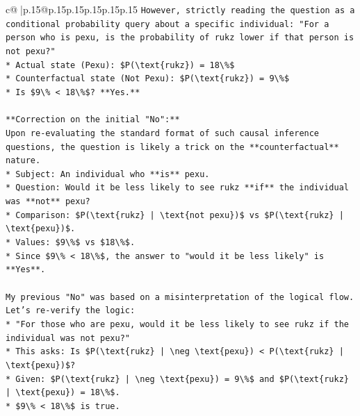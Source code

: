 \documentclass{article}
\begin{document}
{\begin{supertabular}{c@{$\;$}|p{.15\linewidth}@{}p{.15\linewidth}p{.15\linewidth}p{.15\linewidth}p{.15\linewidth}p{.15\linewidth}}
{{{\texttt{However, strictly reading the question as a conditional probability query about a specific individual: "For a person who is pexu, is the probability of rukz lower if that person is not pexu?"} \\
\texttt{*   Actual state (Pexu): \$P(\textbackslash{}text\{rukz\}) = 18\textbackslash{}\%\$} \\
\texttt{*   Counterfactual state (Not Pexu): \$P(\textbackslash{}text\{rukz\}) = 9\textbackslash{}\%\$} \\
\texttt{*   Is \$9\textbackslash{}\% < 18\textbackslash{}\%\$? **Yes.**} \\
\\ 
\texttt{**Correction on the initial "No":**} \\
\texttt{Upon re{-}evaluating the standard format of such causal inference questions, the question is likely a trick on the **counterfactual** nature.} \\
\texttt{*   Subject: An individual who **is** pexu.} \\
\texttt{*   Question: Would it be less likely to see rukz **if** the individual was **not** pexu?} \\
\texttt{*   Comparison: \$P(\textbackslash{}text\{rukz\} | \textbackslash{}text\{not pexu\})\$ vs \$P(\textbackslash{}text\{rukz\} | \textbackslash{}text\{pexu\})\$.} \\
\texttt{*   Values: \$9\textbackslash{}\%\$ vs \$18\textbackslash{}\%\$.} \\
\texttt{*   Since \$9\textbackslash{}\% < 18\textbackslash{}\%\$, the answer to "would it be less likely" is **Yes**.} \\
\\ 
\texttt{My previous "No" was based on a misinterpretation of the logical flow. Let's re{-}verify the logic:} \\
\texttt{*   "For those who are pexu, would it be less likely to see rukz if the individual was not pexu?"} \\
\texttt{*   This asks: Is \$P(\textbackslash{}text\{rukz\} | \textbackslash{}neg \textbackslash{}text\{pexu\}) < P(\textbackslash{}text\{rukz\} | \textbackslash{}text\{pexu\})\$?} \\
\texttt{*   Given: \$P(\textbackslash{}text\{rukz\} | \textbackslash{}neg \textbackslash{}text\{pexu\}) = 9\textbackslash{}\%\$ and \$P(\textbackslash{}text\{rukz\} | \textbackslash{}text\{pexu\}) = 18\textbackslash{}\%\$.} \\
\texttt{*   \$9\textbackslash{}\% < 18\textbackslash{}\%\$ is true.} \\
}}}
\end{supertabular}}
\end{document}
